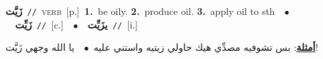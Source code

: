 \documentclass[10pt,a4paper,twoside]{article} %
\begin{document}
\begin{multicols}{2}
{\setlength\topsep{0pt}\textbf{\foreignlanguage{arabic}{زَيَّت}}\ {\color{gray}\texttt{//}\color{black}}\ \textsc{verb}\ [p.]\ \textbf{1.}~be oily.  \textbf{2.}~produce oil.  \textbf{3.}~apply oil to sth\ \ $\bullet$\ \ \setlength\topsep{0pt}\textbf{\foreignlanguage{arabic}{زَيِّت}}\ {\color{gray}\texttt{//}\color{black}}\ [c.]\ \ $\bullet$\ \ \setlength\topsep{0pt}\textbf{\foreignlanguage{arabic}{يزَيِّت}}\ {\color{gray}\texttt{//}\color{black}}\ [i.]\  \begin{flushright}\color{gray}\foreignlanguage{arabic}{\textbf{\underline{\foreignlanguage{arabic}{أمثلة}}}: بس تشوفيه مصدِّي هيك حاولي زيتيه واستني عليه\ $\bullet$\ \  يا الله وجهي زَيَّت!}\end{flushright}\color{black}} \vspace{2mm}


\end{multicols}
\end{document}
